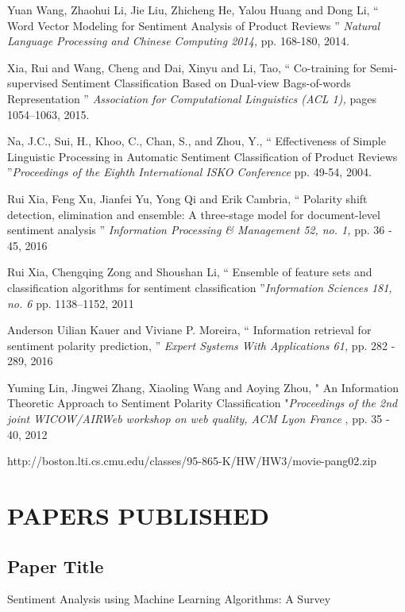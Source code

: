 \documentclass[oneside,a4paper,12pt]{pictreport}
\begin{document}
\begin{thebibliography}{1}
  Yuan Wang, Zhaohui Li, Jie Liu, Zhicheng He, Yalou Huang and Dong Li,
 `` Word Vector Modeling for Sentiment Analysis
of Product Reviews '' {\em Natural Language Processing and Chinese Computing 2014,} pp. 168-180, 2014.


Xia, Rui and Wang, Cheng and Dai, Xinyu and Li, Tao, 
`` Co-training for Semi-supervised Sentiment Classification Based on Dual-view Bags-of-words Representation ''
  {\em Association for Computational Linguistics (ACL 1),} pages 1054–1063, 2015.
  
Na, J.C., Sui, H., Khoo, C., Chan, S., and Zhou, Y., `` Effectiveness of Simple Linguistic Processing in Automatic 
Sentiment Classification of Product Reviews ''{\em Proceedings 
of the Eighth International ISKO Conference
 } pp. 49-54, 2004.
 
 Rui Xia, Feng Xu, Jianfei Yu, Yong Qi and Erik Cambria, `` Polarity shift detection, elimination and ensemble:
A three-stage model for document-level sentiment analysis '' {\em  Information Processing \& Management 52, no. 1, } pp. 36 - 45, 2016

Rui Xia, Chengqing Zong and Shoushan Li, `` Ensemble of feature sets and classification algorithms
for sentiment classification ''{\em  Information Sciences 181, no. 6 } pp. 1138–1152, 2011

Anderson Uilian Kauer and Viviane P. Moreira, `` Information retrieval for sentiment polarity prediction, ''
{\em Expert Systems With Applications 61,} pp. 282 - 289, 2016

Yuming Lin, Jingwei Zhang, Xiaoling Wang and Aoying Zhou, " An Information Theoretic Approach to Sentiment Polarity
Classification "{\em Proceedings of the 2nd joint WICOW/AIRWeb workshop on web quality, ACM Lyon France }, pp. 35 - 40, 2012

http://boston.lti.cs.cmu.edu/classes/95-865-K/HW/HW3/movie-pang02.zip
\end{thebibliography}

\appendix
\chapter{PAPERS PUBLISHED}
\section{Paper Title}
Sentiment Analysis using Machine Learning Algorithms: A Survey
\end{document}
